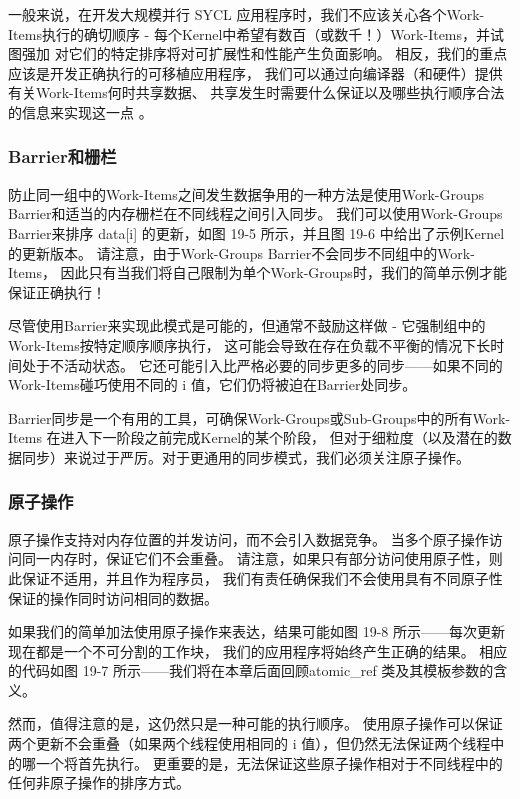 一般来说，在开发大规模并行 SYCL 应用程序时，我们不应该关心各个Work-Items执行的确切顺序 
- 每个Kernel中希望有数百（或数千！）Work-Items，并试图强加 对它们的特定排序将对可扩展性和性能产生负面影响。 
相反，我们的重点应该是开发正确执行的可移植应用程序，
我们可以通过向编译器（和硬件）提供有关Work-Items何时共享数据、
共享发生时需要什么保证以及哪些执行顺序合法的信息来实现这一点 。

\subsubsection{Barrier和栅栏}
防止同一组中的Work-Items之间发生数据争用的一种方法是使用Work-Groups Barrier和适当的内存栅栏在不同线程之间引入同步。 
我们可以使用Work-Groups Barrier来排序 data[i] 的更新，如图 19-5 所示，并且图 19-6 中给出了示例Kernel的更新版本。 
请注意，由于Work-Groups Barrier不会同步不同组中的Work-Items，
因此只有当我们将自己限制为单个Work-Groups时，我们的简单示例才能保证正确执行！

尽管使用Barrier来实现此模式是可能的，但通常不鼓励这样做 - 它强制组中的Work-Items按特定顺序顺序执行，
这可能会导致在存在负载不平衡的情况下长时间处于不活动状态。 
它还可能引入比严格必要的同步更多的同步——如果不同的Work-Items碰巧使用不同的 i 值，它们仍将被迫在Barrier处同步。

Barrier同步是一个有用的工具，可确保Work-Groups或Sub-Groups中的所有Work-Items
在进入下一阶段之前完成Kernel的某个阶段，
但对于细粒度（以及潜在的数据同步）来说过于严厉。对于更通用的同步模式，我们必须关注原子操作。

\subsubsection{原子操作}
原子操作支持对内存位置的并发访问，而不会引入数据竞争。 当多个原子操作访问同一内存时，保证它们不会重叠。 
请注意，如果只有部分访问使用原子性，则此保证不适用，并且作为程序员，
我们有责任确保我们不会使用具有不同原子性保证的操作同时访问相同的数据。

如果我们的简单加法使用原子操作来表达，结果可能如图 19-8 所示——每次更新现在都是一个不可分割的工作块，
我们的应用程序将始终产生正确的结果。 
相应的代码如图 19-7 所示——我们将在本章后面回顾atomic\_ref 类及其模板参数的含义。

然而，值得注意的是，这仍然只是一种可能的执行顺序。 
使用原子操作可以保证两个更新不会重叠（如果两个线程使用相同的 i 值），但仍然无法保证两个线程中的哪一个将首先执行。 
更重要的是，无法保证这些原子操作相对于不同线程中的任何非原子操作的排序方式。

